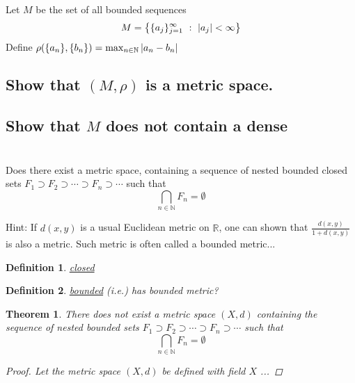 \documentclass[]{article}
\newcommand{\R}{\mathbb{R}}
\newcommand{\N}{\mathbb{N}}
\newcommand{\st}{\ : \ }
\newtheorem{definition}{Definition}
\newtheorem{theorem}{Theorem}
\begin{document}
\newpage
\section{}
Let $M$ be the set of all bounded sequences
\[
    M = \qty{\{a_j\}_{j=1}^{\infty} \st \abs{a_j} < \infty}
\]
Define $\rho(\{a_n\},\{b_n\}) = \max_{n \in \N} \abs{a_n - b_n}$


\subsection{Show that $(M,\rho)$ is a metric space.}








\subsection{Show that $M$ does not contain a dense}
















\newpage
\section{}
Does there exist a metric space, containing a sequence of nested bounded closed sets 
$F_1 \supset F_2 \supset \cdots \supset F_n \supset \cdots$
such that
\[
    \bigcap_{n \in \N} F_n = \emptyset
\]

Hint: If $d(x,y)$ is a usual Euclidean metric on $\R$, 
one can shown that $\frac{d(x,y)}{1 + d(x,y)}$ is also a metric.
Such metric is often called a bounded metric...

\begin{definition}
    \emph{\underline{closed}}
\end{definition}

\begin{definition}
    \emph{\underline{bounded}} (i.e.) has bounded metric?
\end{definition}

\begin{theorem}
    There does not exist a metric space $(X,d)$ 
    containing the sequence of nested bounded sets 
    $F_1 \supset F_2 \supset \cdots \supset F_n \supset \cdots$
    such that \[
        \bigcap_{n \in \N} F_n = \emptyset
    \]
    \begin{proof}
        Let the metric space $(X,d)$ be defined with field $X$ ...
    \end{proof}
\end{theorem}
\end{document}
